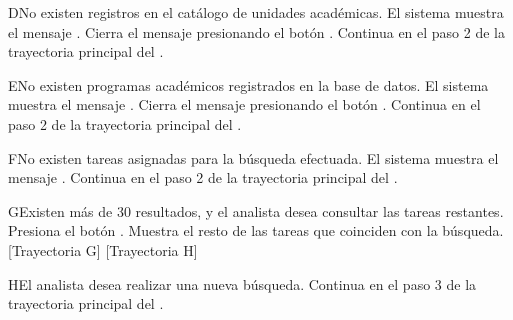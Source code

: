 
\begin{UCtrayectoriaA}{D}{No existen registros en el catálogo de unidades académicas.}
    \UCpaso El sistema muestra el mensaje .
    \UCpaso[\UCactor] Cierra el mensaje presionando el botón .
    \UCpaso Continua en el paso 2 de la trayectoria principal del .
\end{UCtrayectoriaA}


\begin{UCtrayectoriaA}{E}{No existen programas académicos registrados en la base de datos.}
    \UCpaso El sistema muestra el mensaje .
    \UCpaso[\UCactor] Cierra el mensaje presionando el botón .
    \UCpaso Continua en el paso 2 de la trayectoria principal del .
\end{UCtrayectoriaA}


\begin{UCtrayectoriaA}{F}{No existen tareas asignadas para la búsqueda efectuada.}
    \UCpaso El sistema muestra el mensaje .
    \UCpaso Continua en el paso 2 de la trayectoria principal del .
\end{UCtrayectoriaA}


\begin{UCtrayectoriaA}{G}{Existen más de 30 resultados, y el analista desea consultar las tareas restantes.}
    \UCpaso [\UCactor] Presiona el botón . 
    \UCpaso Muestra el resto de las tareas que coinciden con la búsqueda. [Trayectoria G] [Trayectoria H] 
\end{UCtrayectoriaA}


\begin{UCtrayectoriaA}{H}{El analista desea realizar una nueva búsqueda.}
    \UCpaso Continua en el paso 3 de la trayectoria principal del .
\end{UCtrayectoriaA}

